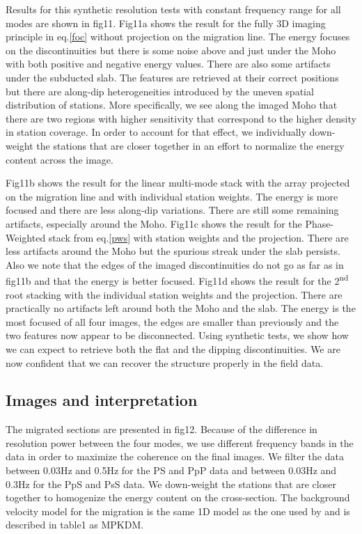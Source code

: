 \documentclass[9pt,a4paper]{article}
\numberwithin{equation}{section}
\begin{document}
\begin{multicols}{2}
Results for this synthetic resolution tests with constant frequency range for all modes are shown in fig11.
Fig11a shows the result for the fully 3D imaging principle in eq.\eqref{foc} without projection on the migration line.
The energy focuses on the discontinuities but there is some noise above and just under the Moho with both positive and negative energy values.
There are also some artifacts under the subducted slab.
The features are retrieved at their correct positions but there are along-dip heterogeneities introduced by the uneven spatial distribution of stations.
More specifically, we see along the imaged Moho that there are two regions with higher sensitivity that correspond to the higher density in station coverage.
In order to account for that effect, we individually down-weight the stations that are closer together in an effort to normalize the energy content across the image.

Fig11b shows the result for the linear multi-mode stack with the array projected on the migration line and with individual station weights.
The energy is more focused and there are less along-dip variations.
There are still some remaining artifacts, especially around the Moho.
Fig11c shows the result for the Phase-Weighted stack from eq.\eqref{pws} with station weights and the projection.
There are less artifacts around the Moho but the spurious streak under the slab persists.
Also we note that the edges of the imaged discontinuities do not go as far as in fig11b and that the energy is better focused.
Fig11d shows the result for the 2\textsuperscript{nd} root stacking with the individual station weights and the projection.
There are practically no artifacts left around both the Moho and the slab.
The energy is the most focused of all four images, the edges are smaller than previously and the two features now appear to be disconnected. 
Using synthetic tests, we show how we can expect to retrieve both the flat and the dipping discontinuities.
We are now confident that we can recover the structure properly in the field data.

\subsection{Images and interpretation}

The migrated sections are presented in fig12.
Because of the difference in resolution power between the four modes, we use different frequency bands in the data in order to maximize the coherence on the final images.
We filter the data between 0.03Hz and 0.5Hz for the PS and PpP data and between 0.03Hz and 0.3Hz for the PpS and PsS data.
We down-weight the stations that are closer together to homogenize the energy content on the cross-section.
The background velocity model for the migration is the same 1D model as the one used by \cite{pear_jgr_12} and is described in table1 as MPKDM.


\end{multicols}
\end{document}
